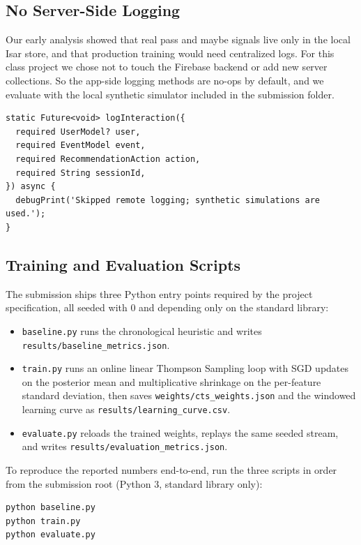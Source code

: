 \documentclass{article}
\begin{document}
\subsection{No Server-Side Logging}
Our early analysis showed that real pass and maybe signals live only in the local Isar store, and that production training would need centralized logs. For this class project we chose not to touch the Firebase backend or add new server collections. So the app-side logging methods are no-ops by default, and we evaluate with the local synthetic simulator included in the submission folder.

\begin{lstlisting}
static Future<void> logInteraction({
  required UserModel? user,
  required EventModel event,
  required RecommendationAction action,
  required String sessionId,
}) async {
  debugPrint('Skipped remote logging; synthetic simulations are used.');
}
\end{lstlisting}

\subsection{Training and Evaluation Scripts}
The submission ships three Python entry points required by the project specification, all seeded with 0 and depending only on the standard library:
\begin{itemize}\sloppy
    \item \texttt{baseline.py} runs the chronological heuristic and writes \texttt{results/baseline\_metrics.json}.
    \item \texttt{train.py} runs an online linear Thompson Sampling loop with SGD updates on the posterior mean and multiplicative shrinkage on the per-feature standard deviation, then saves \texttt{weights/cts\_weights.json} and the windowed learning curve as \texttt{results/learning\_curve.csv}.
    \item \texttt{evaluate.py} reloads the trained weights, replays the same seeded stream, and writes \texttt{results/evaluation\_metrics.json}.
\end{itemize}

To reproduce the reported numbers end-to-end, run the three scripts in order from the submission root (Python 3, standard library only):

\begin{lstlisting}[language=bash]
python baseline.py
python train.py
python evaluate.py
\end{lstlisting}
\end{document}
